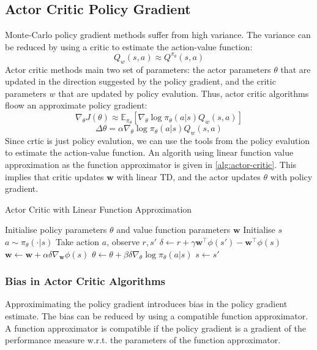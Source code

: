 \subsection{Actor Critic Policy Gradient}
Monte-Carlo policy gradient methods suffer from high variance. The variance can be reduced by
using a critic to estimate the action-value function:
\[
    Q_w(s,a) \approx Q^{\pi_\theta}(s,a)  
\]
Actor critic methods main two set of parameters: the actor parameters \(\theta\) that are updated
in the direction suggested by the policy gradient, and the critic parameters \(w\) that are updated
by policy evalution.
Thus, actor critic algorithms floow an approximate policy gradient:
\[
    \nabla_\theta J(\theta) \approx \mathbb{E}_{\pi_\theta} \left[ 
        \nabla_\theta \log \pi_\theta(a|s) Q_w(s,a)
    \right]
\]
\[
    \Delta \theta = \alpha \nabla_\theta \log \pi_\theta(a|s) Q_w(s,a)  
\]
Since crtic is just policy evalution, we can use the tools from the policy evalution to estimate
the action-value function. An algorith using linear function value approximation as the function
approximator is given in \autoref{alg:actor-critic}. This implies that critic updates \(\mathbf{w}\)
with linear TD, and the actor updates \(\theta\) with policy gradient.
\begin{algorithm}[H]
    \caption{Actor Critic with Linear Function Approximation}
    \label{alg:actor-critic}
    \begin{algorithmic}[1]
        \State Initialise policy parameters \(\theta\) and value function parameters \(\mathbf{w}\)
            \State Initialise \(s\)
            \Repeat
                \State \(a \sim \pi_\theta(\cdot|s)\)
                \State Take action \(a\), observe \(r,s'\)
                \State \(\delta \leftarrow r + \gamma \mathbf{w}^{\top} \phi(s') - \mathbf{w}^{\top} \phi(s)\)
                \State \(\mathbf{w} \leftarrow \mathbf{w} + \alpha \delta \nabla_\mathbf{w} \phi(s)\)
                \State \(\theta \leftarrow \theta + \beta \delta \nabla_\theta \log \pi_\theta(a|s)\)
                \State \(s \leftarrow s'\)
        \EndFor
    \end{algorithmic}
\end{algorithm} 

\subsubsection{Bias in Actor Critic Algorithms}
Approximimating the policy gradient introduces bias in the policy gradient estimate. The bias
can be reduced by using a compatible function approximator. A function approximator is compatible
if the policy gradient is a gradient of the performance measure w.r.t. the parameters of the
function approximator.

